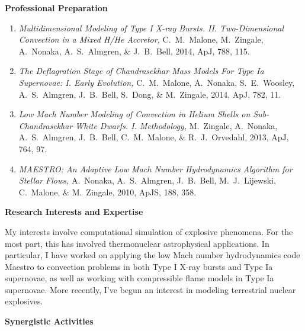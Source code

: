 \documentclass[11pt,letterpaper,english]{article}
\begin{document}
\begin{flushleft} {\bf Professional Preparation}
\begin{enumerate}
\item {\it Multidimensional Modeling of Type I X-ray
  Bursts. II. Two-Dimensional Convection in a Mixed H/He Accretor, }
  C.~M.~Malone, M.~Zingale, A.~Nonaka, A.~S.~Almgren, \& J.~B.~Bell,
  2014, ApJ, 788, 115.

\item {\it The Deflagration Stage of Chandrasekhar Mass Models For
  Type Ia Supernovae: I. Early Evolution, } C.~M.~Malone, A.~Nonaka,
  S.~E.~Woosley, A.~S.~Almgren, J.~B.~Bell, S.~Dong, \& M.~Zingale,
  2014, ApJ, 782, 11.

\item {\it Low Mach Number Modeling of Convection in Helium Shells on
  Sub-Chandrasekhar White Dwarfs. I. Methodology,} M.~Zingale,
  A.~Nonaka, A.~S.~Almgren, J.~B.~Bell, C.~M.~Malone, \&
  R.~J.~Orvedahl, 2013, ApJ, 764, 97.


\item {\it MAESTRO: An Adaptive Low Mach Number Hydrodynamics
  Algorithm for Stellar Flows,} A.~Nonaka, A.~S.~Almgren, J.~B.~Bell,
  M.~J.~Lijewski, C.~Malone, \& M.~Zingale, 2010, ApJS, 188, 358.

\end{enumerate}

\vspace{-6pt}
{\bf Research Interests and Expertise}
{\parindent 16pt

My interests involve computational simulation of explosive phenomena.
For the most part, this has involved thermonuclear astrophysical
applications.  In particular, I have worked on applying the low Mach
number hydrodynamics code Maestro to convection problems in both Type
I X-ray bursts and Type Ia supernovae, as well as working with
compressible flame models in Type Ia supernovae.  More recently, I've
begun an interest in modeling terrestrial nuclear explosives.

}


\vspace{.04in}
{\bf Synergistic Activities}
\vspace{-6pt}
\begin{enumerate} \itemsep1pt \parskip0pt 


\end{enumerate}
\end{flushleft}
\end{document}
